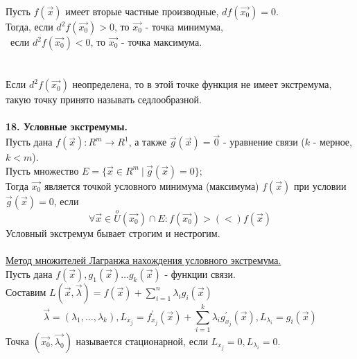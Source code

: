 \documentclass[12pt]{article}
\begin{document}
Пусть $f(\overrightarrow{x})$ имеет вторые частные производные, $df(\overrightarrow{x_0}) = 0$.\\
Тогда, если $d^2 f(\overrightarrow{x_0})>0$, то $\overrightarrow{x_0}$ - точка минимума,\\
\indent \indent \ если $d^2 f(\overrightarrow{x_0})<0$, то $\overrightarrow{x_0}$ - точка максимума.\\
\\
\\
Если $d^2f(\overrightarrow{x_0})$ неопределена, то в этой точке функция не имеет экстремума, такую точку принято называть седлообразной.\\
\\
\label{question18_1}\textbf{18. Условные экстремумы.}\\
Пусть дана $f(\overrightarrow{x}) : R^m\to R^1$, а также $\overrightarrow{g}(\overrightarrow{x}) = \overrightarrow{0}$ - уравнение связи ($k$ - мерное, $k < m$).\\
Пусть множество $E = \{ \overrightarrow{x} \in R^m \ | \ \overrightarrow{g}(\overrightarrow{x}) = 0 \}$;\\
Тогда $\overrightarrow{x_0}$ является точкой условного минимума (максимума) $f (\overrightarrow{x})$ при условии $\overrightarrow{g}(\overrightarrow{x}) = 0$, если\\
$$\forall \overrightarrow{x} \in \overset{o}{U}(\overrightarrow{x_0}) \cap E : f(\overrightarrow{x_0}) >(<) f(\overrightarrow{x})$$
Условный экстремум бывает строгим и нестрогим.\\
\\
\label{question18_2}\uline{Метод множителей Лагранжа нахождения условного экстремума.}\\
Пусть дана $f(\overrightarrow{x}), g_1(\overrightarrow{x})\dots g_{k}(\overrightarrow{x})$ - функции связи.\\
Составим $L(\overrightarrow{x}, \overrightarrow{\lambda})=f(\overrightarrow{x})+\sum_{i=1}^n \lambda_i g_i (\overrightarrow{x})$\\
$$\overrightarrow{\lambda} = (\lambda_1, \dots, \lambda_k), L_{x_j}=f^{'}_{x_j}(\overrightarrow{x})+\sum_{i=1}^k \lambda_i g^{'}_{{x_j}}(\overrightarrow{x}), L_{\lambda_i}=g_i(\overrightarrow{x})$$
Точка $(\overrightarrow{x_0}, \overrightarrow{\lambda_0})$ называется стационарной, если $L_{x_j} = 0, L_{\lambda_i}=0$.\\
\\
\\
\end{document}
